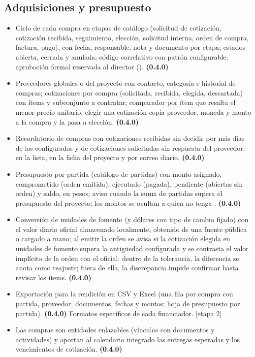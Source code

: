 \documentclass[11pt,a4paper]{article}
\newcommand{\etapa}[1]{\textcolor{grismedio}{[etapa #1]}}
\begin{document}
\subsection{Adquisiciones y presupuesto}
\label{sec:compras}
\begin{itemize}
\item Ciclo de cada compra en etapas de catálogo (solicitud de cotización, cotización recibida, seguimiento, elección, solicitud interna, orden de compra, factura, pago), con fecha, responsable, nota y documento por etapa; estados abierta, cerrada y anulada; código correlativo con patrón configurable; aprobación formal reservada al director (). \textbf{(0.4.0)}
\item Proveedores globales o del proyecto con contacto, categoría e historial de compras; cotizaciones por compra (solicitada, recibida, elegida, descartada) con ítems y subconjunto a contratar; comparador por ítem que resalta el menor precio unitario; elegir una cotización copia proveedor, moneda y monto a la compra y la pasa a elección. \textbf{(0.4.0)}
\item Recordatorio de compras con cotizaciones recibidas sin decidir por más días de los configurados y de cotizaciones solicitadas sin respuesta del proveedor: en la lista, en la ficha del proyecto y por correo diario. \textbf{(0.4.0)}
\item Presupuesto por partida (catálogo de partidas) con monto asignado, comprometido (orden emitida), ejecutado (pagada), pendiente (abiertas sin orden) y saldo, en pesos; aviso cuando la suma de partidas supera el presupuesto del proyecto; los montos se ocultan a quien no tenga . \textbf{(0.4.0)}
\item Conversión de unidades de fomento (y dólares con tipo de cambio fijado) con el valor diario oficial almacenado localmente, obtenido de una fuente pública o cargado a mano; al emitir la orden se avisa si la cotización elegida en unidades de fomento supera la antigüedad configurada y se contrasta el valor implícito de la orden con el oficial: dentro de la tolerancia, la diferencia se anota como reajuste; fuera de ella, la discrepancia impide confirmar hasta revisar los ítems. \textbf{(0.4.0)}
\item Exportación para la rendición en CSV y Excel (una fila por compra con partida, proveedor, documentos, fechas y montos; hoja de presupuesto por partida). \textbf{(0.4.0)} Formatos específicos de cada financiador. \etapa{2}
\item Las compras son entidades enlazables (vínculos con documentos y actividades) y aportan al calendario integrado las entregas esperadas y los vencimientos de cotización. \textbf{(0.4.0)}
\end{itemize}
\end{document}

